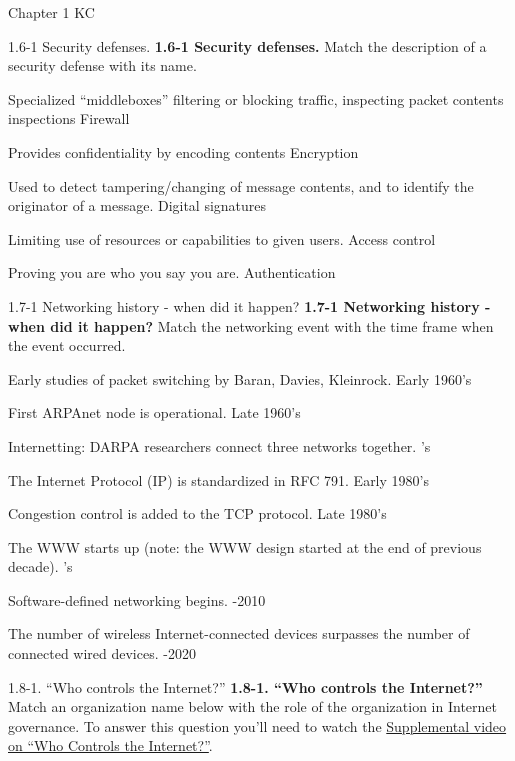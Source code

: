\documentclass[a4paper]{article}
\begin{document}
\begin{quiz}{Chapter 1 KC}
\begin{matching}[points=1,shuffle=true]{1.6-1 Security defenses.}
\textbf{1.6-1 Security defenses.}
Match the description of a security defense with its name.
\item Specialized ``middleboxes'' filtering or blocking traffic, inspecting packet contents inspections \answer Firewall
\item Provides confidentiality by encoding contents \answer Encryption
\item Used to detect tampering/changing of message contents, and to identify the originator of a message. \answer Digital signatures
\item Limiting use of resources or capabilities to given users. \answer Access control
\item Proving you are who you say you are. \answer Authentication
\end{matching}

\begin{matching}[points=1]{1.7-1 Networking history - when did it happen?}
\textbf{1.7-1 Networking history - when did it happen?}
Match the networking event with the time frame when the event occurred.
\item Early studies of packet switching by Baran, Davies, Kleinrock. \answer Early 1960's
\item First ARPAnet node is operational. \answer Late 1960's
\item Internetting: DARPA researchers connect three networks together. 's
\item The Internet Protocol (IP) is standardized in RFC 791. \answer Early 1980's
\item Congestion control is added to the TCP protocol. \answer Late 1980's
\item The WWW starts up (note: the WWW design started at the end of previous decade). 's
\item Software-defined networking begins. -2010
\item The number of wireless Internet-connected devices surpasses the number of connected wired devices. -2020
\end{matching}

\begin{matching}[points=1,shuffle=true]{1.8-1. ``Who controls the Internet?''}
\textbf{1.8-1. ``Who controls the Internet?''}
Match an organization name below with the role of the organization in Internet governance. 
To answer this question you'll need to watch the \href{https://www.youtube.com/watch?v=xrd4hD_9fS8}{Supplemental video on ``Who Controls the Internet?''}.


\end{matching}
\end{quiz}
\end{document}
